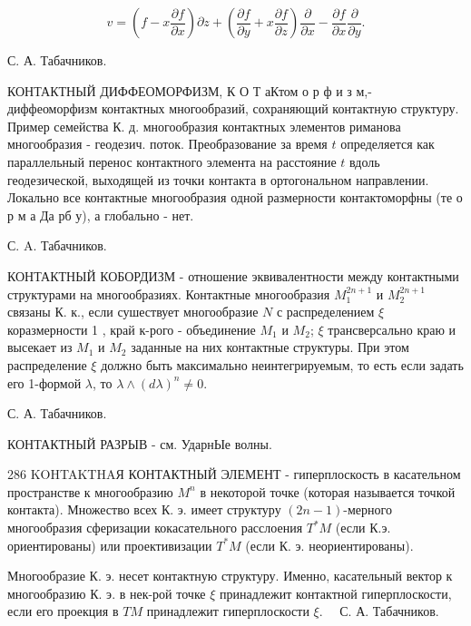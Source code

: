 \documentclass[10pt]{article}
\begin{document}
\[

v=\left(f-x \frac{\partial f}{\partial x}\right) \partial z+\left(\frac{\partial f}{\partial y}+x \frac{\partial f}{\partial z}\right) \frac{\partial}{\partial x}-\frac{\partial f}{\partial x} \frac{\partial}{\partial y} .

\]



С. А. Табачников.



КОНТАКТНЫЙ ДИФФЕОМОРФИЗМ, К О Т аКтом о р ф и з м,- диффеоморфизм контактных многообразий, сохраняющий контактную структуру. Пример семейства К. д. многообразия контактных элементов риманова многообразия - геодезич. поток. Преобразование за время $t$ определяется как параллельный перенос контактного элемента на расстояние $t$ вдоль геодезической, выходящей из точки контакта в ортогональном направлении. Локально все контактные многообразия одной размерности контактоморфны (те о р м а Да рб у), а глобально - нет.



С. A. Табачников.



КОНТАКТНЫЙ КОБОРДИЗМ - отношение эквивалентности между контактными структурами на многообразиях. Контактные многообразия $M_{1}^{2 n+1}$ и $M_{2}^{2 n+1}$ связаны К. к., если сушествует многообразие $N$ с распределением $\xi$ коразмерности 1 , край к-рого - объединение $M_{1}$ и $M_{2}$; $\xi$ трансверсально краю и высекает из $M_{1}$ и $M_{2}$ заданные на них контактные структуры. При этом распределение $\xi$ должно быть максимально неинтегрируемым, то есть если задать его 1-формой $\lambda$, то $\lambda \wedge(d \lambda)^{n} \neq 0$.



С. А. Табачников.



КОНТАКТНЫЙ РАЗРЫВ - см. УдарнЫе волны.



286 KOHTAKTHAЯ КОНТАКТНЫЙ ЭЛЕМЕНТ - гиперплоскость в касательном пространстве к многообразию $M^{n}$ в некоторой точке (которая называется точкой контакта). Множество всех К. э. имеет структуру $(2 n-1)$-мерного многообразия сферизации кокасательного расслоения $T^{*} M$ (если К.э. ориентированы) или проективизации $T^{*} M$ (если К. э. неориентированы).



Многообразие К. э. несет контактную структуру. Именно, касательный вектор к многообразию К. э. в нек-рой точке $\xi$ принадлежит контактной гиперплоскости, если его проекция в $T M$ принадлежит гиперплоскости $\xi . \quad$ С. $А$. Табачников.
\end{document}

